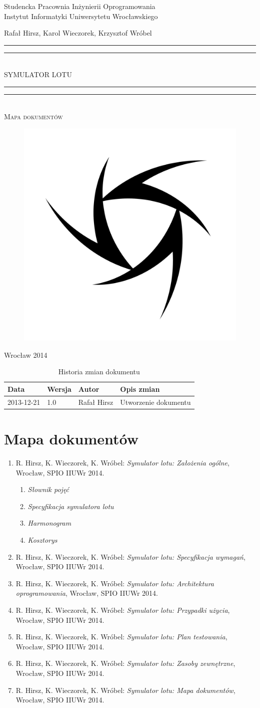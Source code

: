 \documentclass{mwrep}
\newcommand{\bitem}[1]{\item R. Hirsz, K. Wieczorek, K. Wróbel: \textit{Symulator lotu: #1}, Wrocław, SPIO IIUWr 2014.}
\newcommand*{\titleGP}{\begingroup
\centering

{\large Studencka Pracownia Inżynierii Oprogramowania}\\Instytut Informatyki Uniwersytetu Wrocławskiego\par
\vspace*{16\baselineskip}

{\Large Rafał Hirsz, Karol Wieczorek, Krzysztof Wróbel\par}
\vspace*{\baselineskip}

\rule{\textwidth}{1.6pt}\vspace*{-\baselineskip}\vspace*{2pt}
\rule{\textwidth}{0.4pt}\\[\baselineskip]

{\Huge SYMULATOR LOTU}\\[0.2\baselineskip]

\rule{\textwidth}{0.4pt}\vspace*{-\baselineskip}\vspace{3.2pt}
\rule{\textwidth}{1.6pt}\\[\baselineskip]

\scshape
{\huge Mapa dokumentów}\par
\vspace*{2\baselineskip}

\begin{figure}[h]
\centering
\includegraphics[width=5\baselineskip]{flightsim-team-logo.pdf}
\end{figure}
\vfill

{\large Wrocław 2014}\par

\pagebreak

\endgroup}
\begin{document}
\thispagestyle{empty}
\titleGP

\begin{center}
\begin{table}[h]
\begin{center}
\caption{Historia zmian dokumentu}\label{T:Zmiany}
\vspace{3ex}
\begin{tabularx}{1\textwidth}{|l|l|l|X|}
\hline
Data & Wersja & Autor & Opis zmian \\ \hline
2013-12-21 & 1.0 & Rafał Hirsz & Utworzenie dokumentu \\
\hline
\end{tabularx}
\end{center}
\end{table}
\end{center}

\section{Mapa dokumentów}

\begin{enumerate}
    \bitem{Założenia ogólne}
    \begin{enumerate}
        \item \textit{Słownik pojęć}
        \item \textit{Specyfikacja symulatora lotu}
        \item \textit{Harmonogram}
        \item \textit{Kosztorys}
    \end{enumerate}
    \bitem{Specyfikacja wymagań}
    \bitem{Architektura oprogramowania}
    \bitem{Przypadki użycia}
    \bitem{Plan testowania}
    \bitem{Zasoby zewnętrzne}
    \bitem{Mapa dokumentów}
\end{enumerate}
\end{document}
